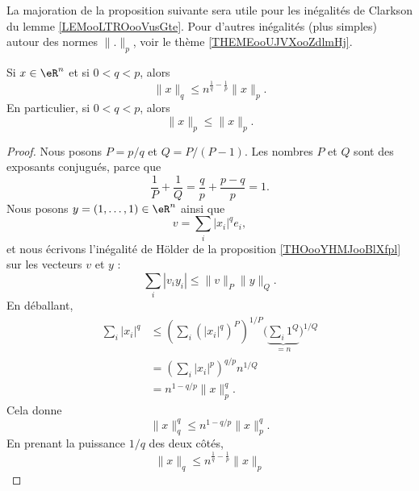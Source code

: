 La majoration de la proposition suivante sera utile pour les inégalités de Clarkson du lemme \ref{LEMooLTROooVusGte}. Pour d'autres inégalités (plus simples) autour des normes \( \| . \|_p\), voir le thème \ref{THEMEooUJVXooZdlmHj}.
\begin{proposition}       \label{PROPooQZTNooGACMlQ}
    Si \( x\in \eR^n\) et si \( 0<q<p\), alors
    \begin{equation}
        \| x \|_q\leq n^{\frac{1}{ q }-\frac{1}{ p }}   \| x \|_p.
    \end{equation}
    En particulier, si \( 0 < q < p\), alors
    \begin{equation}
        \| x \|_p\leq \| x \|_p.
    \end{equation}
\end{proposition}

\begin{proof}
    Nous posons \( P=p/q\) et \( Q=P/(P-1)\). Les nombres \( P\) et \( Q\) sont des exposants conjugués, parce que
    \begin{equation}
        \frac{1}{ P }+\frac{1}{ Q }=\frac{ q }{ p }+\frac{ p-q }{ p }=1.
    \end{equation}
    Nous posons \( y=(1,\ldots, 1)\in \eR^n\) ainsi que
    \begin{equation}
        v=\sum_i| x_i |^qe_i,
    \end{equation}
    et nous écrivons l'inégalité de Hölder de la proposition \ref{THOooYHMJooBlXfpl} sur les vecteurs \( v\) et \( y\) :
    \begin{equation}
        \sum_i| v_iy_i |\leq \| v \|_P\| y \|_Q.
    \end{equation}
    En déballant,
    \begin{subequations}
        \begin{align}
            \sum_i| x_i |^q & \leq  \left( \sum_i(| x_i |^q)^P \right)^{1/P}\big( \underbrace{\sum_i1^Q}_{=n} \big)^{1/Q}\\
                            &   =   \left( \sum_i | x_i |^p \right)^{q/p}n^{1/Q}\\
                            &   =   n^{1-q/p}\| x \|_p^q.
        \end{align}
    \end{subequations}
    Cela donne
    \begin{equation}
        \| x \|_q^q\leq n^{1-q/p}\| x \|_p^q.
    \end{equation}
    En prenant la puissance \( 1/q\) des deux côtés,
    \begin{equation}
        \| x \|_q\leq   n^{\frac{1}{ q }-\frac{1}{ p }}   \| x \|_p
    \end{equation}
\end{proof}
